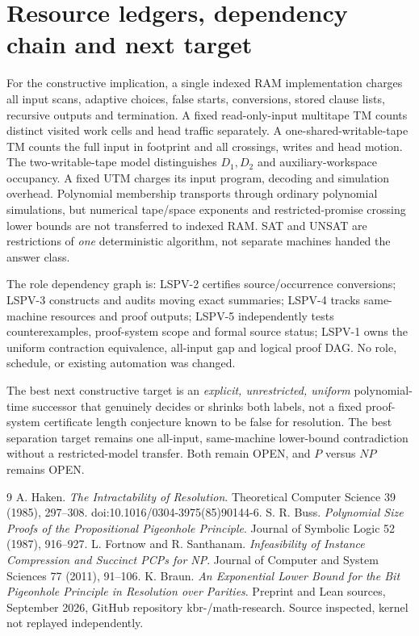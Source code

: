 \documentclass[11pt]{article}
\begin{document}
\section{Resource ledgers, dependency chain and next target}
For the constructive implication, a single indexed RAM implementation charges all input scans, adaptive choices, false starts, conversions, stored clause lists, recursive outputs and termination. A fixed read-only-input multitape TM counts distinct visited work cells and head traffic separately. A one-shared-writable-tape TM counts the full input in footprint and all crossings, writes and head motion. The two-writable-tape model distinguishes $D_1,D_2$ and auxiliary-workspace occupancy. A fixed UTM charges its input program, decoding and simulation overhead. Polynomial membership transports through ordinary polynomial simulations, but numerical tape/space exponents and restricted-promise crossing lower bounds are not transferred to indexed RAM. SAT and UNSAT are restrictions of \emph{one} deterministic algorithm, not separate machines handed the answer class.

The role dependency graph is: LSPV-2 certifies source/occurrence conversions; LSPV-3 constructs and audits moving exact summaries; LSPV-4 tracks same-machine resources and proof outputs; LSPV-5 independently tests counterexamples, proof-system scope and formal source status; LSPV-1 owns the uniform contraction equivalence, all-input gap and logical proof DAG. No role, schedule, or existing automation was changed.

The best next constructive target is an \emph{explicit, unrestricted, uniform} polynomial-time successor that genuinely decides or shrinks both labels, not a fixed proof-system certificate length conjecture known to be false for resolution. The best separation target remains one all-input, same-machine lower-bound contradiction without a restricted-model transfer. Both remain OPEN, and $P$ versus $NP$ remains OPEN.
\begin{thebibliography}{9}
 A. Haken. \emph{The Intractability of Resolution}. Theoretical Computer Science 39 (1985), 297--308. doi:10.1016/0304-3975(85)90144-6.
 S. R. Buss. \emph{Polynomial Size Proofs of the Propositional Pigeonhole Principle}. Journal of Symbolic Logic 52 (1987), 916--927.
 L. Fortnow and R. Santhanam. \emph{Infeasibility of Instance Compression and Succinct PCPs for NP}. Journal of Computer and System Sciences 77 (2011), 91--106.
 K. Braun. \emph{An Exponential Lower Bound for the Bit Pigeonhole Principle in Resolution over Parities}. Preprint and Lean sources, September 2026, GitHub repository kbr-/math-research. Source inspected, kernel not replayed independently.
\end{thebibliography}
\end{document}
